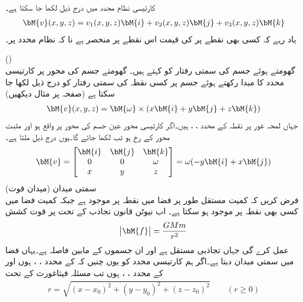 کارتیسی نظام محدد میں درج ذیل لکھا جا سکتا ہے۔
\begin{align*}
\bM{v}(x,y,z)=v_1(x,y,z)\bM{i}+v_2(x,y,z)\bM{j}+v_3(x,y,z)\bM{k}
\end{align*} 
یاد رہے کہ کسی بھی نقطے پر   کی قیمت  اس نقطے پر منحصر ہے نا کہ نظام محدد پر۔

\quad {} ()\\
گھومتے ہوئے جسم  کی سمتی رفتار  کو  کہتے ہیں۔ گھومتے جسم کی محور پر کارتیسی محدد کا مبدا رکھتے ہوئے جسم پر کسی نقطہ   کی سمتی رفتار کو درج ذیل لکھا جا سکتا ہے (صفحہ  پر مثال  دیکھیں)
\begin{align} 
\bM{v}(x,y,z)=\bM{\omega} \times (x\bM{i}+y\bM{j}+z\bM{k})
\end{align} 
جہاں لمحہ غور پر نقطہ   کے محدد  ، ،  ہیں۔اگر کارتیسی  محور عین جسم کی محور پر واقع ہو اور  مثبت  محور  کے رخ ہو تب  لکھا جائے گا۔یوں درج ذیل ملتا ہے۔
\begin{align}
\bM{v}=\begin{bmatrix} \bM{i}&\bM{j}&\bM{k}\\0&0&\omega\\x&y&z \end{bmatrix}=\omega (-y\bM{i}+x\bM{j})
\end{align}
\quad سمتی میدان (میدان قوت)\\
فرض کریں کہ کمیت   مستقل طور پر فضا میں نقطہ  پر موجود ہے جبکہ کمیت  فضا میں کسی بھی نقطہ  پر موجود ہو سکتا ہے۔ اب نیوٹن قانون تجاذب  کے تحت  پر قوت کشش
\begin{align}
\abs{\bM{f}}=\frac{GMm}{r^2}
\end{align}
عمل کرے گی جہاں  تجاذبی مستقل ہے اور  ان جسموں کے مابین فاصلہ ہے۔یہاں  فضا میں سمتی میدان دیتا ہے۔اگر ہم کارتیسی محدد کو یوں چنیں کہ  کے محدد ، ،  ہوں اور  کے محدد ، ،  ہوں تب مسئلہ فیثاغورث کے تحت 
\begin{align*}
r=\sqrt{(x-x_0)^2+(y-y_0)^2+(z-z_0)^2}\quad \quad (r\ge 0)
\end{align*}
